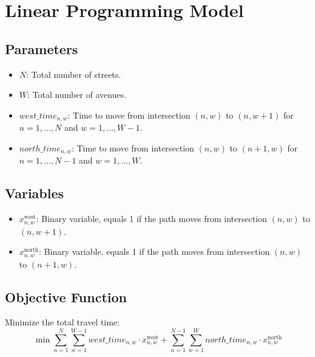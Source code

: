 \documentclass{article}
\begin{document}
\section*{Linear Programming Model}

\subsection*{Parameters}
\begin{itemize}
    \item $N$: Total number of streets.
    \item $W$: Total number of avenues.
    \item $west\_time_{n,w}$: Time to move from intersection $(n, w)$ to $(n, w+1)$ for $n = 1, \ldots, N$ and $w = 1, \ldots, W-1$.
    \item $north\_time_{n,w}$: Time to move from intersection $(n, w)$ to $(n+1, w)$ for $n = 1, \ldots, N-1$ and $w = 1, \ldots, W$.
\end{itemize}

\subsection*{Variables}
\begin{itemize}
    \item $x_{n,w}^{\text{west}}$: Binary variable, equals 1 if the path moves from intersection $(n, w)$ to $(n, w+1)$.
    \item $x_{n,w}^{\text{north}}$: Binary variable, equals 1 if the path moves from intersection $(n, w)$ to $(n+1, w)$.
\end{itemize}

\subsection*{Objective Function}
Minimize the total travel time:
\begin{equation}
\min \sum_{n=1}^{N} \sum_{w=1}^{W-1} west\_time_{n,w} \cdot x_{n,w}^{\text{west}} + \sum_{n=1}^{N-1} \sum_{w=1}^{W} north\_time_{n,w} \cdot x_{n,w}^{\text{north}}
\end{equation}
\end{document}
